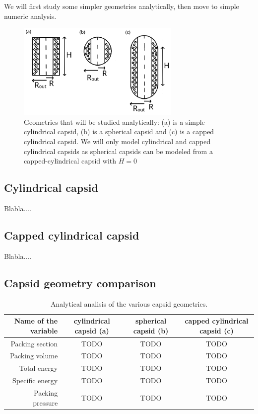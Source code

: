 \documentclass{article}
\begin{document}
We will first study some simpler geometries analytically, then move to simple numeric analysis.

\begin{figure}[H]
    \centering
    \includegraphics[width=0.7\textwidth]{analitical_geometries.png}
    \caption{Geometries that will be studied analytically: (a) is a simple cylindrical capsid, (b) is a spherical capsid and (c) is a capped cylindrical capsid. We will only model cylindrical and capped cylindrical capsids as spherical capsids can be modeled from a capped-cylindrical capsid with $H=0$}
    \label{fig:enter-label}
\end{figure}

\subsection{Cylindrical capsid}

Blabla....

\subsection{Capped cylindrical capsid}

Blabla....

\subsection{Capsid geometry comparison}

\begin{table}[h]
    \centering
    \begin{tabular}{|| r | c | c | c ||}
        \hline \hline
        \textbf{Name of the variable} & \textbf{cylindrical capsid (a)} & \textbf{spherical capsid (b)} & \textbf{capped cylindrical capsid (c)} \\
        \hline \hline
        Packing section & TODO & TODO & TODO \\
        Packing volume  & TODO & TODO & TODO \\
        Total energy  & TODO & TODO & TODO \\
        Specific energy  & TODO & TODO & TODO \\
        Packing pressure  & TODO & TODO & TODO \\
        \hline \hline
    \end{tabular}
    \caption{Analytical analisis of the various capsid geometries.}
\end{table}
\end{document}
